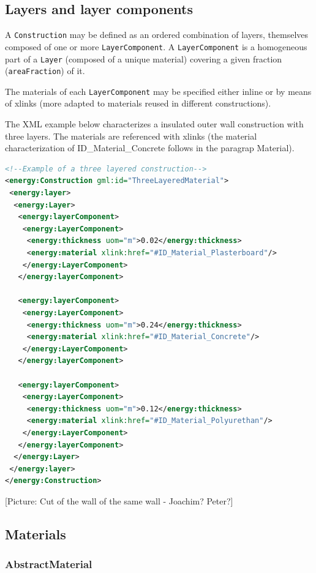 \documentclass[a4paper,12pt]{article}
\begin{document}
\subsection{Layers and layer
components}\label{layers-and-layer-components}

A \lstinline!Construction! may be defined as an ordered combination of
layers, themselves composed of one or more \lstinline!LayerComponent!. A
\lstinline!LayerComponent! is a homogeneous part of a \lstinline!Layer!
(composed of a unique material) covering a given fraction
(\lstinline!areaFraction!) of it.

The materials of each \lstinline!LayerComponent! may be specified either
inline or by means of xlinks (more adapted to materials reused in
different constructions).

The XML example below characterizes a insulated outer wall construction
with three layers. The materials are referenced with xlinks (the
material characterization of ID\_Material\_Concrete follows in the
paragrap Material).

\begin{lstlisting}[language=XML]
<!--Example of a three layered construction-->
<energy:Construction gml:id="ThreeLayeredMaterial">
 <energy:layer>
  <energy:Layer>
   <energy:layerComponent>
    <energy:LayerComponent>
     <energy:thickness uom="m">0.02</energy:thickness>
     <energy:material xlink:href="#ID_Material_Plasterboard"/>
    </energy:LayerComponent>
   </energy:layerComponent>

   <energy:layerComponent>
    <energy:LayerComponent>
     <energy:thickness uom="m">0.24</energy:thickness>
     <energy:material xlink:href="#ID_Material_Concrete"/>
    </energy:LayerComponent>
   </energy:layerComponent>

   <energy:layerComponent>
    <energy:LayerComponent>
     <energy:thickness uom="m">0.12</energy:thickness>
     <energy:material xlink:href="#ID_Material_Polyurethan"/>
    </energy:LayerComponent>
   </energy:layerComponent>
  </energy:Layer>
 </energy:layer>
</energy:Construction>
\end{lstlisting}

{[}Picture: Cut of the wall of the same wall - Joachim? Peter?{]}

\subsection{Materials}\label{materials}

\subsubsection{AbstractMaterial}\label{abstractmaterial}
\end{document}

